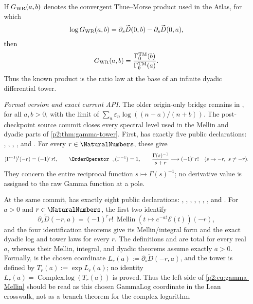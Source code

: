 \documentclass[11pt,oneside]{article}
\numberwithin{equation}{section}
\theoremstyle{definition}
\theoremstyle{remark}
\newcommand{\eps}{\varepsilon}
\begin{document}
\begin{corollary}
\label{p2:cor:Woods-Robbins}
If $G_{\rm WR}(a,b)$ denotes the convergent Thue--Morse product used in the Atlas, for which
\[
 \log G_{\rm WR}(a,b)=\partial_s\widetilde D(0,b)
 -\partial_s\widetilde D(0,a),
\]
then
\begin{equation}
 G_{\rm WR}(a,b)=\frac{\Gamma_0^{\rm TM}(b)}{\Gamma_0^{\rm TM}(a)}.
 \label{p2:eq:WR-gamma}
\end{equation}
Thus the known product is the ratio law at the base of an infinite dyadic differential
tower.
\end{corollary}

\emph{Formal version and exact current API.}  The older origin-only bridge remains
 in , for
all \(a,b>0\), with  the limit of
\(\sum_n\eps_n\log((n+a)/(n+b))\).  The post-checkpoint source commit
 closes every spectral level used in the Mellin and dyadic parts
of \cref{p2:thm:gamma-tower}.  First,  has exactly
five public declarations:
,
,
,
, and
.  For every \(r\in\NaturalNumbers\), these
give
\[
 (\Gamma^{-1})'(-r)=(-1)^r r!,\qquad
 \OrderOperator_{-r}(\Gamma^{-1})=1,\qquad
 \frac{\Gamma(s)^{-1}}{s+r}\longrightarrow(-1)^r r!
 \quad(s\to-r,\ s\ne-r).
\]
They concern the entire reciprocal function \(s\mapsto\Gamma(s)^{-1}\); no
derivative value is assigned to the raw Gamma function at a pole.

At the same commit,  has exactly eight public
declarations:
,
,
,
,
,
,
, and
.  For \(a>0\) and \(r\in\NaturalNumbers\),
the first two identify
\[
 \partial_s\widetilde D(-r,a)=(-1)^r r!\,
 \operatorname{Mellin}(t\mapsto e^{-at}\mathcal E(t))(-r),
\]
and the four identification theorems give its Mellin/integral form and the
exact dyadic log and tower laws for every \(r\).  The definitions
 and
 are total for every real \(a\), whereas
their Mellin, integral, and dyadic theorems assume exactly \(a>0\).  Formally,
 is the chosen coordinate
\(L_r(a):=\partial_s\widetilde D(-r,a)\), and the tower is defined by
\(T_r(a):=\exp L_r(a)\); no identity
\(L_r(a)=\operatorname{Complex.log}(T_r(a))\) is proved.  Thus the left side of
\eqref{p2:eq:gamma-Mellin} should be read as this chosen GammaLog coordinate in
the Lean crosswalk, not as a branch theorem for the complex logarithm.
\end{document}
